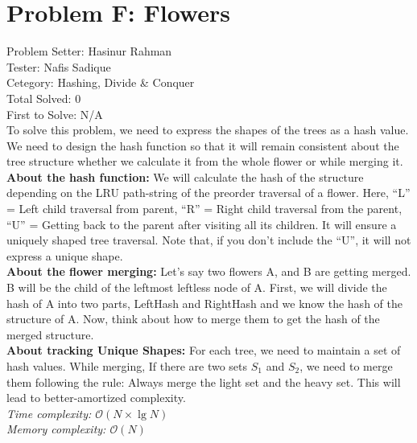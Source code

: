 \section*{Problem F: Flowers}
Problem Setter: Hasinur Rahman \\
Tester: Nafis Sadique \\
Cetegory: Hashing, Divide \& Conquer \\
Total Solved: 0 \\
First to Solve: N/A \\

To solve this problem, we need to express the shapes of the trees as a hash value. We need to design the hash function so that it will remain consistent about the tree structure whether we calculate it from the whole flower or while merging it.\\
\textbf{About the hash function:} We will calculate the hash of the structure depending on the LRU path-string of the preorder traversal of a flower. Here, ``L'' = Left child traversal from parent, ``R'' = Right child traversal from the parent, ``U'' = Getting back to the parent after visiting all its children. It will ensure a uniquely shaped tree traversal. Note that, if you don't include the ``U'', it will not express a unique shape.\\
\textbf{About the flower merging:} Let's say two flowers A, and B are getting merged. B will be the child of the leftmost leftless node of A. First, we will divide the  hash of A into two parts, LeftHash and RightHash and we know the hash of the structure of A. Now, think about how to merge them to get the hash of the merged structure.\\
\textbf{About tracking Unique Shapes:} For each tree, we need to maintain a set of hash values. While merging, If there are two sets $S_{1}$ and $S_{2}$, we need to merge them following the rule: Always merge the light set and the heavy set. This will lead to better-amortized complexity.\\
\textit{Time complexity: $\mathcal{O}(N\times\lg{N})$}\\
\textit{Memory complexity: $\mathcal{O}(N)$}\\